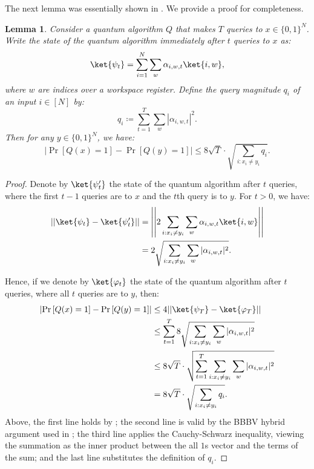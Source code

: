 \documentclass[11pt]{article}%
\newtheorem{lemma}[theorem]{Lemma}
\begin{document}
The next lemma was essentially shown in \cite{BBBV97}. We provide a proof for completeness.
\begin{lemma}
\label{lem:bbbv_query_magnitude}
Consider a quantum algorithm $Q$ that makes $T$ queries to $x \in \{0,1\}^N$. Write the state of the quantum algorithm immediately after $t$ queries to $x$ as:
\[\ket{\psi_t} = \sum_{i=1}^N \sum_{w} \alpha_{i,w,t}\ket{i,w},\]
where $w$ are indices over a workspace register. Define the \emph{query magnitude} $q_i$ of an input $i \in [N]$ by:
\[q_i \coloneqq \sum_{t=1}^{T} \sum_w \left| \alpha_{i,w,t} \right|^2. \]
Then for any $y \in \{0,1\}^N$, we have:
\[
\left|\Pr\left[Q(x) = 1 \right] - \Pr\left[Q(y) = 1 \right] \right| \le 8\sqrt{T} \cdot \sqrt{\sum_{i : x_i \neq y_i} q_i}.
\]
\end{lemma}

\begin{proof}
Denote by $\ket{\psi'_t}$ the state of the quantum algorithm after $t$ queries, where the first $t-1$ queries are to $x$ and the $t$th query is to $y$. For $t > 0$, we have:
\begin{align*}
|| \ket{\psi_t} - \ket{\psi'_t} || &= \left|\left| 2 \sum_{i : x_i \neq y_i} \sum_{w} \alpha_{i,w,t} \ket{i,w} \right|\right|\\
&= 2\sqrt{\sum_{i : x_i \neq y_i} \sum_{w} |\alpha_{i,w,t}|^2}.
\end{align*}

Hence, if we denote by $\ket{\varphi_t}$ the state of the quantum algorithm after $t$ queries, where all $t$ queries are to $y$, then:
\begin{align*}
\left|\Pr\left[Q(x) = 1 \right] - \Pr\left[Q(y) = 1 \right] \right| & \le 4||\ket{\psi_T} - \ket{\varphi_T}||\\ &\le \sum_{t=1}^T 8\sqrt{\sum_{i : x_i \neq y_i} \sum_{w} |\alpha_{i,w,t}|^2}\\
&\le 8\sqrt{T} \cdot \sqrt{\sum_{t=1}^T \sum_{i : x_i \neq y_i} \sum_w |\alpha_{i,w,t}|^2}\\
&= 8\sqrt{T} \cdot \sqrt{\sum_{i : x_i \neq y_i} q_i}.
\end{align*}
Above, the first line holds by \cite[Lemma 3.6]{BV97}; the second line is valid by the BBBV hybrid argument used in \cite[Theorem 3.3]{BBBV97}; the third line applies the Cauchy-Schwarz inequality, viewing the summation as the inner product between the all $1$s vector and the terms of the sum; and the last line substitutes the definition of $q_i$.
\end{proof}
\end{document}
